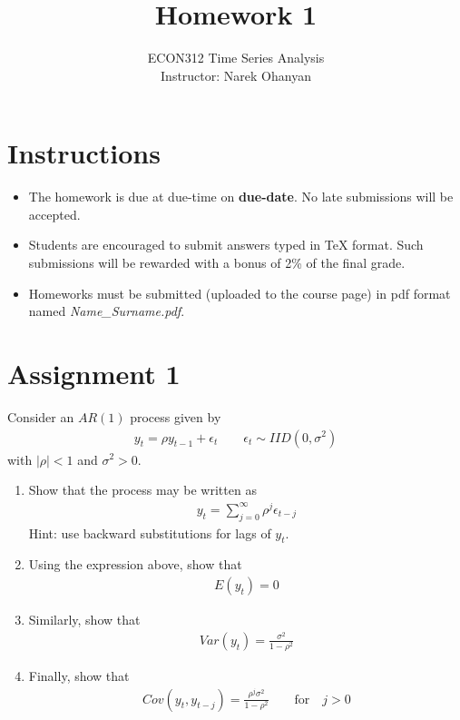 \documentclass[12pt]{article}
\title{\textbf{Homework 1}}
\author{ECON312 Time Series Analysis \\ Instructor: Narek Ohanyan}
\date{}
\begin{document}
\maketitle


\section*{Instructions}

\begin{itemize}
    \item The homework is due at due-time on \textbf{due-date}. No late submissions will be accepted.
    \item Students are encouraged to submit answers typed in TeX format. Such submissions will be rewarded with a bonus of 2\% of the final grade.
    \item Homeworks must be submitted (uploaded to the course page) in pdf format named \textit{Name\_Surname.pdf}.
\end{itemize}


\section*{Assignment 1}

Consider an $ AR(1) $ process given by
\begin{align*}
    y_t = \rho y_{t-1} + \epsilon_t \qquad \epsilon_t \sim IID(0, \sigma^2)
\end{align*}
with $ | \rho | < 1 $ and $ \sigma^2 > 0 $.

\begin{enumerate}
    \item Show that the process may be written as
          \begin{align*}
              y_t = \sum_{j=0}^{\infty} \rho^j \epsilon_{t-j}
          \end{align*}
          Hint: use backward substitutions for lags of $ y_t $.
    \item Using the expression above, show that
          \begin{align*}
              E \left( y_t \right) = 0
          \end{align*}
    \item Similarly, show that
          \begin{align*}
              Var \left( y_t \right) = \frac{\sigma^2}{1-\rho^2}
          \end{align*}
    \item Finally, show that
          \begin{align*}
              Cov \left( y_t, y_{t-j} \right) = \frac{\rho^j \sigma^2}{1-\rho^2} \qquad \text{for} \quad j > 0
          \end{align*}
\end{enumerate}

\end{document}
